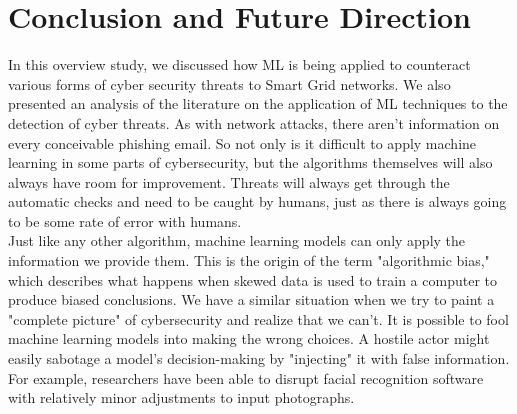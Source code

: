 \section{Conclusion and Future Direction}
In this overview study, we discussed how ML is being applied to counteract various forms of cyber security threats to Smart Grid networks. We also presented an analysis of the literature on the application of ML techniques to the detection of cyber threats.
As with network attacks, there aren't information on every conceivable phishing email. So not only is it difficult to apply machine learning in some parts of cybersecurity, but the algorithms themselves will also always have room for improvement. Threats will always get through the automatic checks and need to be caught by humans, just as there is always going to be some rate of error with humans.
\\Just like any other algorithm, machine learning models can only apply the information we provide them. This is the origin of the term "algorithmic bias," which describes what happens when skewed data is used to train a computer to produce biased conclusions. We have a similar situation when we try to paint a "complete picture" of cybersecurity and realize that we can't.
It is possible to fool machine learning models into making the wrong choices. A hostile actor might easily sabotage a model's decision-making by "injecting" it with false information. For example, researchers have been able to disrupt facial recognition software with relatively minor adjustments to input photographs.
